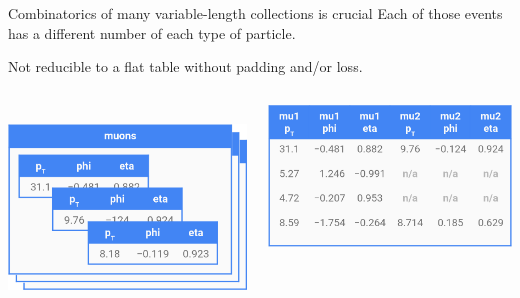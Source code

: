 \documentclass[aspectratio=169]{beamer}
\begin{document}
\begin{frame}{Combinatorics of many variable-length collections is crucial}
\Large
\vspace{0.25 cm}
Each of those events has a different number of each type of particle.

\vspace{0.25 cm}
Not reducible to a flat table without padding and/or loss.

\vspace{0.5 cm}
\begin{columns}[b]
\mbox{ } \hfill \includegraphics[width=0.9\linewidth]{muons-as-objects-2.png} \hfill \mbox{ }

\includegraphics[width=\linewidth]{muons-as-a-table.png}
\end{columns}
\end{frame}
\end{document}

